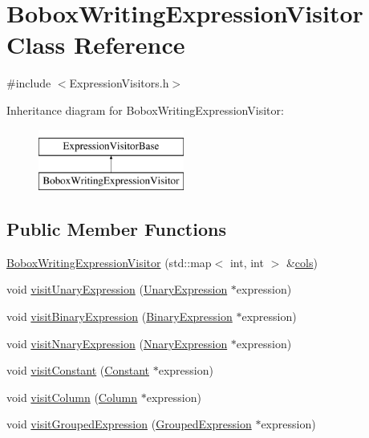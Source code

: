 \hypertarget{class_bobox_writing_expression_visitor}{\section{Bobox\+Writing\+Expression\+Visitor Class Reference}
\label{class_bobox_writing_expression_visitor}
}


{\ttfamily \#include $<$Expression\+Visitors.\+h$>$}

Inheritance diagram for Bobox\+Writing\+Expression\+Visitor\+:\begin{figure}[H]
\begin{center}
\leavevmode
\includegraphics[height=2.000000cm]{class_bobox_writing_expression_visitor}
\end{center}
\end{figure}
\subsection*{Public Member Functions}
\begin{DoxyCompactItemize}
\item 
\hyperlink{class_bobox_writing_expression_visitor_a977d27ae446d613bc90fb6e29165504b}{Bobox\+Writing\+Expression\+Visitor} (std\+::map$<$ int, int $>$ \&\hyperlink{class_bobox_writing_expression_visitor_a6e0d9ba1a06fd32c8d71dd8e1c068c56}{cols})
\item 
void \hyperlink{class_bobox_writing_expression_visitor_abf4dc22d06dd87f35f577db194b69a71}{visit\+Unary\+Expression} (\hyperlink{class_unary_expression}{Unary\+Expression} $\ast$expression)
\item 
void \hyperlink{class_bobox_writing_expression_visitor_a4e7d193e7b5d361c67a0ee0b82628120}{visit\+Binary\+Expression} (\hyperlink{class_binary_expression}{Binary\+Expression} $\ast$expression)
\item 
void \hyperlink{class_bobox_writing_expression_visitor_ac66d4abc015382d70392acc6593196c3}{visit\+Nnary\+Expression} (\hyperlink{class_nnary_expression}{Nnary\+Expression} $\ast$expression)
\item 
void \hyperlink{class_bobox_writing_expression_visitor_aa51161e2a5c08a3f5ca37901fbcc572f}{visit\+Constant} (\hyperlink{class_constant}{Constant} $\ast$expression)
\item 
void \hyperlink{class_bobox_writing_expression_visitor_a2547b638ff123190d33492ed3ce410ea}{visit\+Column} (\hyperlink{class_column}{Column} $\ast$expression)
\item 
void \hyperlink{class_bobox_writing_expression_visitor_a12180fc75d31108cf8c542513e0f1db5}{visit\+Grouped\+Expression} (\hyperlink{class_grouped_expression}{Grouped\+Expression} $\ast$expression)
\end{DoxyCompactItemize}
